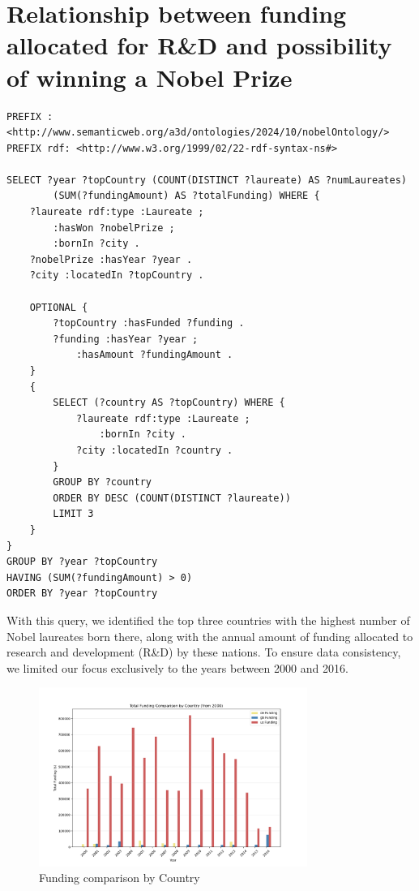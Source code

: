 \documentclass{article}
\begin{document}
\newpage

\section{Relationship between funding allocated for R\&D and possibility of winning a Nobel Prize}

\begin{lstlisting}
PREFIX : <http://www.semanticweb.org/a3d/ontologies/2024/10/nobelOntology/>
PREFIX rdf: <http://www.w3.org/1999/02/22-rdf-syntax-ns#>

SELECT ?year ?topCountry (COUNT(DISTINCT ?laureate) AS ?numLaureates)
        (SUM(?fundingAmount) AS ?totalFunding) WHERE {
    ?laureate rdf:type :Laureate ;
  	    :hasWon ?nobelPrize ;
        :bornIn ?city .
    ?nobelPrize :hasYear ?year .
    ?city :locatedIn ?topCountry .

    OPTIONAL {
        ?topCountry :hasFunded ?funding .
        ?funding :hasYear ?year ;
            :hasAmount ?fundingAmount .
    }
    {
        SELECT (?country AS ?topCountry) WHERE {
            ?laureate rdf:type :Laureate ;
                :bornIn ?city .
            ?city :locatedIn ?country .
        }
        GROUP BY ?country
        ORDER BY DESC (COUNT(DISTINCT ?laureate))
        LIMIT 3
    }
}
GROUP BY ?year ?topCountry
HAVING (SUM(?fundingAmount) > 0)
ORDER BY ?year ?topCountry
\end{lstlisting}

\vspace{1em}

With this query, we identified the top three countries with the highest number of Nobel laureates born there,
along with the annual amount of funding allocated to research and development (R\&D) by these nations.
To ensure data consistency, we limited our focus exclusively to the years between 2000 and 2016.

\begin{figure}[H]
	\centering
	\includegraphics[width=0.78\textwidth]{../queries/plots/funding_comparison_by_country.png}
	\caption{Funding comparison by Country}
	\label{fig:fundings_per_country}
\end{figure}
\end{document}
